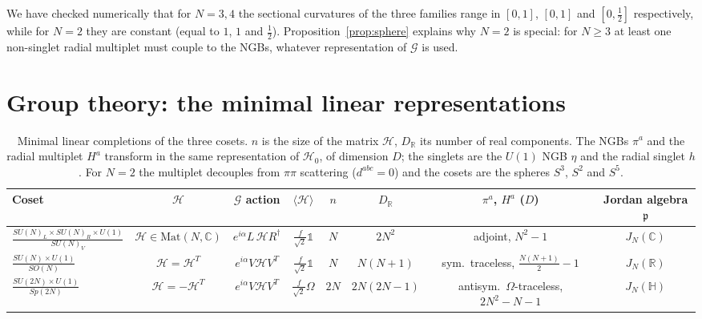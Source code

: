 \documentclass[aps,prd,twocolumn,superscriptaddress,nofootinbib,floatfix]{revtex4-2}
\theoremstyle{remark}
\newcommand{\Hf}{\mathcal{H}}      %
\newcommand{\G}{\mathcal{G}}
\newcommand{\Hg}{\mathcal{H}_0}    %
\newcommand{\p}{\mathfrak{p}}
\begin{document}
We have checked numerically that for $N=3,4$ the sectional curvatures of the three families range in $[0,1]$, $[0,1]$ and $[0,\tfrac12]$ respectively, while for $N=2$ they are constant (equal to $1$, $1$ and $\tfrac12$). Proposition~\ref{prop:sphere} explains why $N=2$ is special: for $N\ge 3$ at least one non-singlet radial multiplet must couple to the NGBs, whatever representation of $\G$ is used.

\section{Group theory: the minimal linear representations}
\label{sec:group}

\begin{table}[t]
\caption{Minimal linear completions of the three cosets. $n$ is the size of the matrix $\Hf$, $D_{\mathbb{R}}$ its number of real components. The NGBs $\pi^a$ and the radial multiplet $H^a$ transform in the same representation of $\Hg$, of dimension $D$; the singlets are the $U(1)$ NGB $\eta$ and the radial singlet $h$. For $N=2$ the multiplet decouples from $\pi\pi$ scattering ($d^{abc}=0$) and the cosets are the spheres $S^3$, $S^2$ and $S^5$.}
\label{tab:reps}
{\small
\begin{ruledtabular}
\begin{tabular}{lccccccc}
Coset & $\Hf$ & $\G$ action & $\langle\Hf\rangle$ & $n$ & $D_{\mathbb{R}}$ & $\pi^a$, $H^a$ ($D$) & Jordan algebra $\p$ \\
\hline
$\frac{SU(N)_L\times SU(N)_R\times U(1)}{SU(N)_V}$ & $\Hf\in\mathrm{Mat}(N,\mathbb{C})$ & $e^{i\alpha}L\,\Hf R^\dagger$ & $\frac{f}{\sqrt2}\mathbb{1}$ & $N$ & $2N^2$ & adjoint, $N^2-1$ & $J_N(\mathbb{C})$ \\
$\frac{SU(N)\times U(1)}{SO(N)}$ & $\Hf=\Hf^T$ & $e^{i\alpha}V\Hf V^T$ & $\frac{f}{\sqrt2}\mathbb{1}$ & $N$ & $N(N+1)$ & sym.\ traceless, $\frac{N(N+1)}{2}{-}1$ & $J_N(\mathbb{R})$\\
$\frac{SU(2N)\times U(1)}{Sp(2N)}$ & $\Hf=-\Hf^T$ & $e^{i\alpha}V\Hf V^T$ & $\frac{f}{\sqrt2}\Omega$ & $2N$ & $2N(2N-1)$ & antisym.\ $\Omega$-traceless, $2N^2{-}N{-}1$ & $J_N(\mathbb{H})$
\end{tabular}
\end{ruledtabular}}
\end{table}
\end{document}
